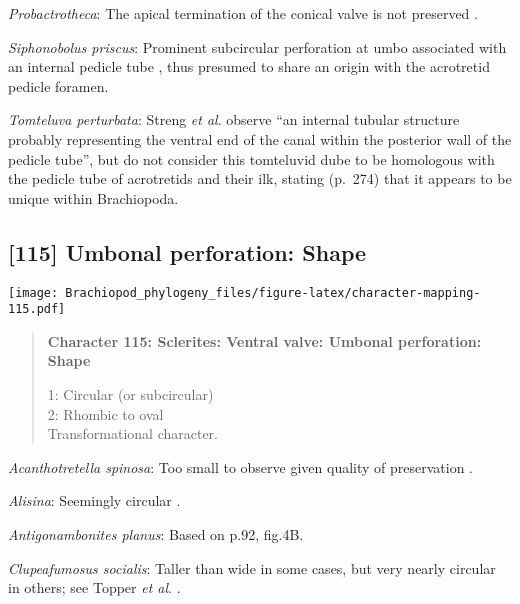 \documentclass[openany]{book}
\theoremstyle{definition}
\theoremstyle{definition}
\theoremstyle{definition}
\theoremstyle{remark}
\begin{document}
\hypertarget{Probactrotheca-coding-114}{}
\emph{Probactrotheca}: The apical termination of the conical valve is
not preserved \citep{Valent2012}.

\hypertarget{Siphonobolus_priscus-coding-114}{}
\emph{Siphonobolus priscus}: Prominent subcircular perforation at umbo
associated with an internal pedicle tube \citep{Popov2009Earlyontogeny},
thus presumed to share an origin with the acrotretid pedicle foramen.

\hypertarget{Tomteluva_perturbata-coding-114}{}
\emph{Tomteluva perturbata}: Streng \emph{et al}.
\citeyearpar{Streng2016Anew} observe ``an internal tubular structure
probably representing the ventral end of the canal within the posterior
wall of the pedicle tube'', but do not consider this tomteluvid dube to
be homologous with the pedicle tube of acrotretids and their ilk,
stating (p.~274) that it appears to be unique within Brachiopoda.

\subsection*{{[}115{]} Umbonal perforation:
Shape}\label{umbonal-perforation-shape}

\texttt{[image: Brachiopod\_phylogeny\_files/figure-latex/character-mapping-115.pdf]}

\begin{quote}
\textbf{Character 115: Sclerites: Ventral valve: Umbonal perforation:
Shape}

1: Circular (or subcircular)\\
2: Rhombic to oval\\
Transformational character.
\end{quote}

\hypertarget{Acanthotretella_spinosa-coding-115}{}
\emph{Acanthotretella spinosa}: Too small to observe given quality of
preservation \citep{Holmer2006Aspinose}.

\hypertarget{Alisina-coding-115}{}
\emph{Alisina}: Seemingly circular \citep{Zhang2011Anobolellate}.

\hypertarget{Antigonambonites_planus-coding-115}{}
\emph{Antigonambonites planus}: Based on p.92, fig.4B.

\hypertarget{Clupeafumosus_socialis-coding-115}{}
\emph{Clupeafumosus socialis}: Taller than wide in some cases, but very
nearly circular in others; see Topper \emph{et al}.
\citeyearpar{Topper2013Reappraisalof}.
\end{document}
